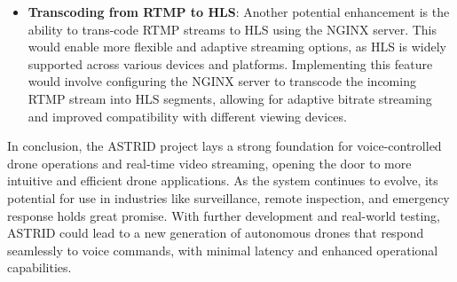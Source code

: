 \begin{itemize}
    \item \textbf{Transcoding from RTMP to HLS}:
    Another potential enhancement is the ability to trans-code \ac{RTMP} streams to \ac{HLS} using the NGINX server. 
    This would enable more flexible and adaptive streaming options, as \ac{HLS} is widely supported across various devices and platforms. 
    Implementing this feature would involve configuring the NGINX server to transcode the incoming \ac{RTMP} stream into HLS segments, 
    allowing for adaptive bitrate streaming and improved compatibility with different viewing devices.

\end{itemize}

In conclusion, the \ac{ASTRID} project lays a strong foundation for voice-controlled drone operations and real-time video streaming, opening the door to more intuitive and efficient drone applications. 
As the system continues to evolve, its potential for use in industries like surveillance, remote inspection, and emergency response holds great promise. 
With further development and real-world testing, \ac{ASTRID} could lead to a new generation of autonomous drones that respond seamlessly to voice commands, with minimal latency and enhanced operational capabilities.
